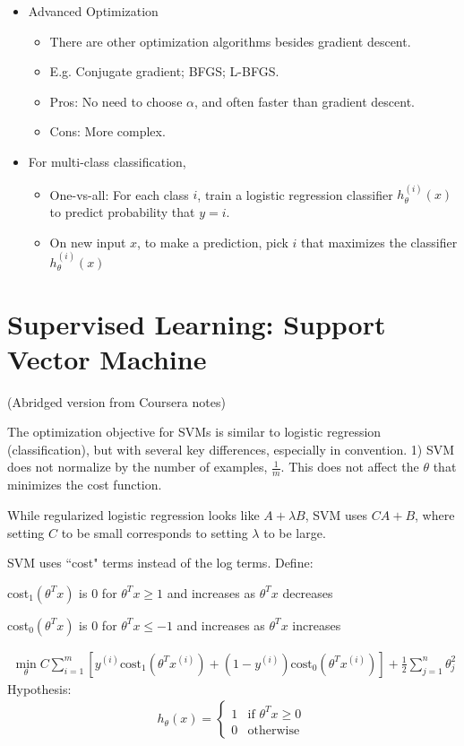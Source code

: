 \documentclass[letterpaper,10pt]{article}
\begin{document}
\begin{itemize}
\item Advanced Optimization
	\begin{itemize}
	\item There are other optimization algorithms besides gradient descent.
	\item E.g. Conjugate gradient; BFGS; L-BFGS.
	\item Pros: No need to choose $\alpha$, and often faster than gradient descent.
	\item Cons: More complex.
	\end{itemize}
	
\item For multi-class classification,
	\begin{itemize}
	\item One-vs-all: For each class $i$, train a logistic regression classifier $h_\theta^{(i)}(x)$ to predict probability that $y=i$.
	\item On new input $x$, to make a prediction, pick $i$ that maximizes the classifier $h_\theta^{(i)}(x)$
	\end{itemize}
\end{itemize}


\section{Supervised Learning: Support Vector Machine}

(Abridged version from Coursera notes)

The optimization objective for SVMs is similar to logistic regression (classification), but with several key differences, especially in convention. 1) SVM does not normalize by the number of examples, $\frac{1}{m}$. This does not affect the $\theta$ that minimizes the cost function.

While regularized logistic regression looks like $A+\lambda B$, SVM uses $CA + B$, where setting $C$ to be small corresponds to setting $\lambda$ to be large.

SVM uses ``cost" terms instead of the log terms. Define:

cost$_1(\theta^Tx)$ is 0 for $\theta^Tx \geq 1$ and increases as $\theta^Tx$ decreases

cost$_0(\theta^Tx)$ is 0 for $\theta^Tx \leq -1$ and increases as $\theta^Tx$ increases

\begin{align}
\min_\theta C \sum_{i=1}^m \left[ y^{(i)} \text{cost}_1(\theta^Tx^{(i)}) + (1-y^{(i)})\text{cost}_0(\theta^Tx^{(i)}) \right] + \frac{1}{2}\sum_{j=1}^n \theta_j^2
\end{align}
Hypothesis:
\begin{align}
	h_\theta (x) =
     	\begin{cases}
       	1 & \text{if  } \theta^Tx \geq 0 \\
       	0 & \text{otherwise  }
     	\end{cases}
\end{align}
\end{document}
